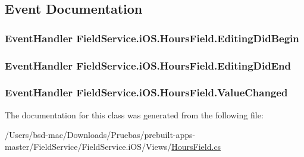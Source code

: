 \subsection{Event Documentation}
\hypertarget{class_field_service_1_1i_o_s_1_1_hours_field_a620f38523cb743ebced6cc01bc13fc74}{
\subsubsection[{Editing\+Did\+Begin}]{\setlength{\rightskip}{0pt plus 5cm}Event\+Handler Field\+Service.\+i\+O\+S.\+Hours\+Field.\+Editing\+Did\+Begin}}\label{class_field_service_1_1i_o_s_1_1_hours_field_a620f38523cb743ebced6cc01bc13fc74}
\hypertarget{class_field_service_1_1i_o_s_1_1_hours_field_a1a7138f210603946fc7a0f39470d8ab7}{
\subsubsection[{Editing\+Did\+End}]{\setlength{\rightskip}{0pt plus 5cm}Event\+Handler Field\+Service.\+i\+O\+S.\+Hours\+Field.\+Editing\+Did\+End}}\label{class_field_service_1_1i_o_s_1_1_hours_field_a1a7138f210603946fc7a0f39470d8ab7}
\hypertarget{class_field_service_1_1i_o_s_1_1_hours_field_ac70fa977a4123616aeabfcf938ef7d52}{
\subsubsection[{Value\+Changed}]{\setlength{\rightskip}{0pt plus 5cm}Event\+Handler Field\+Service.\+i\+O\+S.\+Hours\+Field.\+Value\+Changed}}\label{class_field_service_1_1i_o_s_1_1_hours_field_ac70fa977a4123616aeabfcf938ef7d52}


The documentation for this class was generated from the following file\+:\begin{DoxyCompactItemize}
\item 
/\+Users/bsd-\/mac/\+Downloads/\+Pruebas/prebuilt-\/apps-\/master/\+Field\+Service/\+Field\+Service.\+i\+O\+S/\+Views/\hyperlink{_hours_field_8cs}{Hours\+Field.\+cs}\end{DoxyCompactItemize}
